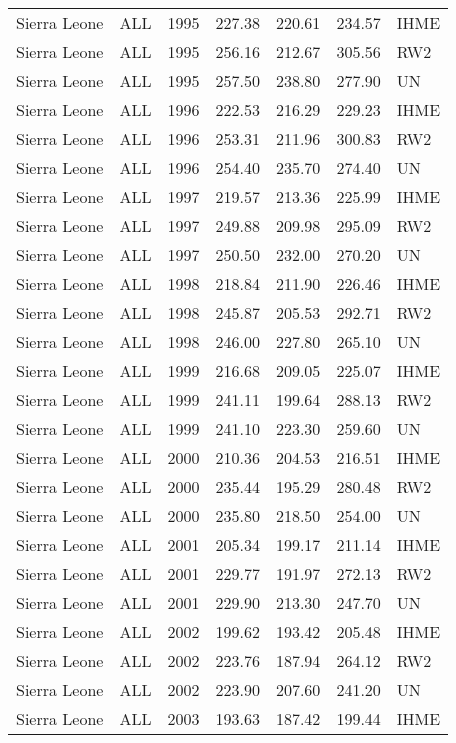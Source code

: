 \begin{longtable}{lllrrrl}
  Sierra Leone & ALL & 1995 & 227.38 & 220.61 & 234.57 & IHME \\ 
  Sierra Leone & ALL & 1995 & 256.16 & 212.67 & 305.56 & RW2 \\ 
  Sierra Leone & ALL & 1995 & 257.50 & 238.80 & 277.90 & UN \\ 
  Sierra Leone & ALL & 1996 & 222.53 & 216.29 & 229.23 & IHME \\ 
  Sierra Leone & ALL & 1996 & 253.31 & 211.96 & 300.83 & RW2 \\ 
  Sierra Leone & ALL & 1996 & 254.40 & 235.70 & 274.40 & UN \\ 
  Sierra Leone & ALL & 1997 & 219.57 & 213.36 & 225.99 & IHME \\ 
  Sierra Leone & ALL & 1997 & 249.88 & 209.98 & 295.09 & RW2 \\ 
  Sierra Leone & ALL & 1997 & 250.50 & 232.00 & 270.20 & UN \\ 
  Sierra Leone & ALL & 1998 & 218.84 & 211.90 & 226.46 & IHME \\ 
  Sierra Leone & ALL & 1998 & 245.87 & 205.53 & 292.71 & RW2 \\ 
  Sierra Leone & ALL & 1998 & 246.00 & 227.80 & 265.10 & UN \\ 
  Sierra Leone & ALL & 1999 & 216.68 & 209.05 & 225.07 & IHME \\ 
  Sierra Leone & ALL & 1999 & 241.11 & 199.64 & 288.13 & RW2 \\ 
  Sierra Leone & ALL & 1999 & 241.10 & 223.30 & 259.60 & UN \\ 
  Sierra Leone & ALL & 2000 & 210.36 & 204.53 & 216.51 & IHME \\ 
  Sierra Leone & ALL & 2000 & 235.44 & 195.29 & 280.48 & RW2 \\ 
  Sierra Leone & ALL & 2000 & 235.80 & 218.50 & 254.00 & UN \\ 
  Sierra Leone & ALL & 2001 & 205.34 & 199.17 & 211.14 & IHME \\ 
  Sierra Leone & ALL & 2001 & 229.77 & 191.97 & 272.13 & RW2 \\ 
  Sierra Leone & ALL & 2001 & 229.90 & 213.30 & 247.70 & UN \\ 
  Sierra Leone & ALL & 2002 & 199.62 & 193.42 & 205.48 & IHME \\ 
  Sierra Leone & ALL & 2002 & 223.76 & 187.94 & 264.12 & RW2 \\ 
  Sierra Leone & ALL & 2002 & 223.90 & 207.60 & 241.20 & UN \\ 
  Sierra Leone & ALL & 2003 & 193.63 & 187.42 & 199.44 & IHME \\ 

\end{longtable}
